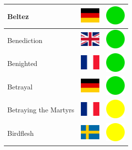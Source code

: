 \documentclass[12pt, a4paper, twoside]{report}
\begin{document}
\begin{center}
\begin{longtable}{|p{5cm}|p{2cm}|p{2cm}|}
Beltez & \includegraphics[width=1cm]{4x3/de} & \includegraphics[width=1cm]{likes/y} \\ \hline
Benediction & \includegraphics[width=1cm]{4x3/gb} & \includegraphics[width=1cm]{likes/y} \\ \hline
Benighted & \includegraphics[width=1cm]{4x3/fr} & \includegraphics[width=1cm]{likes/y} \\ \hline
Betrayal & \includegraphics[width=1cm]{4x3/de} & \includegraphics[width=1cm]{likes/y} \\ \hline
Betraying the Martyrs & \includegraphics[width=1cm]{4x3/fr} & \includegraphics[width=1cm]{likes/m} \\ \hline
Birdflesh & \includegraphics[width=1cm]{4x3/se} & \includegraphics[width=1cm]{likes/m} \\ \hline

\end{longtable}
\end{center}
\end{document}
